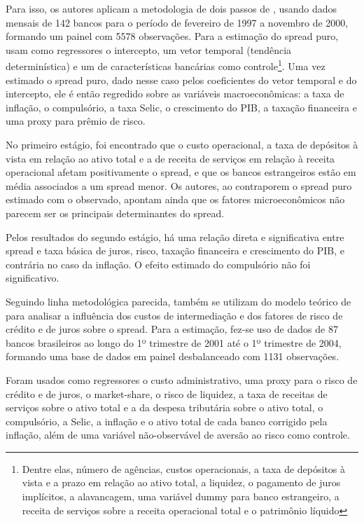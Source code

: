 \documentclass[a4paper,
               article,
               12pt,
               openany,
               oneside,
               english,
               brazil]{abntex2}
\numberwithin{equation}{section}
\begin{document}
    Para isso, os autores aplicam a metodologia de dois passos de \textcite{hoesaunders}, usando dados mensais de 142 bancos para o período de fevereiro de 1997 a novembro de 2000, formando um painel com 5578 observações. Para a estimação do spread puro, usam como regressores o intercepto, um vetor temporal (tendência determinística) e um de características bancárias como controle\footnote{Dentre elas, número de agências, custos operacionais, a taxa de depósitos à vista e a prazo em relação ao ativo total, a liquidez, o pagamento de juros implícitos, a alavancagem, uma variável dummy para banco estrangeiro, a receita de serviços sobre a receita operacional total e o patrimônio líquido}. Uma vez estimado o spread puro, dado nesse caso pelos coeficientes do vetor temporal e do intercepto, ele é então regredido sobre as variáveis macroeconômicas: a taxa de inflação, o compulsório, a taxa Selic, o crescimento do PIB, a taxação financeira e uma proxy para prêmio de risco.

    No primeiro estágio, foi encontrado que o custo operacional, a taxa de depósitos à vista em relação ao ativo total e a de receita de serviços em relação à receita operacional afetam positivamente o spread, e que os bancos estrangeiros estão em média associados a um spread menor. Os autores, ao contraporem o spread puro estimado com o observado, apontam ainda que os fatores microeconômicos não parecem ser os principais determinantes do spread.
    
    Pelos resultados do segundo estágio, há uma relação direta e significativa entre spread e taxa básica de juros, risco, taxação financeira e crescimento do PIB, e contrária no caso da inflação. O efeito estimado do compulsório não foi significativo.

    Seguindo linha metodológica parecida, \textcite{bignotto06} também se utilizam do modelo teórico de \textcite{hoesaunders} para analisar a influência dos custos de intermediação e dos fatores de risco de crédito e de juros sobre o spread. Para a estimação, fez-se uso de dados de 87 bancos brasileiros ao longo do 1º trimestre de 2001 até o 1º trimestre de 2004, formando uma base de dados em painel desbalanceado com 1131 observações.
    
    Foram usados como regressores o custo administrativo, uma proxy para o risco de crédito e de juros, o market-share, o risco de liquidez, a taxa de receitas de serviços sobre o ativo total e a da despesa tributária sobre o ativo total, o compulsório, a Selic, a inflação e o ativo total de cada banco corrigido pela inflação, além de uma variável não-observável de aversão ao risco como controle. 
    
\end{document}
